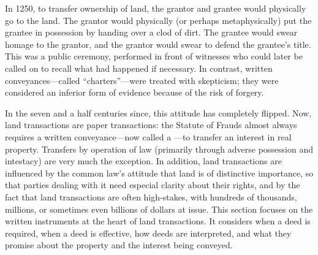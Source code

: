 In 1250, to transfer ownership of land, the grantor and grantee would physically
go to the land. The grantor would physically (or perhaps metaphysically) put
the grantee in possession by handing over a clod of dirt. The grantee would
swear homage to the grantor, and the grantor would swear to defend the
grantee's title. This was a public ceremony, performed in front of witnesses
who could later be called on to recall what had happened if necessary. In
contrast, written conveyances---called ``charters''---were treated with
skepticism; they were considered an inferior form of evidence because of the
risk of forgery.

In the seven and a half centuries since, this attitude has completely flipped.
Now, land transactions are paper transactions: the Statute of Frauds almost
always requires a written conveyance---now called a ---to transfer an
interest in real property. Transfers by operation of law (primarily through
adverse possession and intestacy) are very much the exception. In addition,
land transactions are influenced by the common law's attitude that land is of
distinctive importance, so that parties dealing with it need especial clarity
about their rights, and by the fact that land transactions are often
high-stakes, with hundreds of thousands, millions, or sometimes even billions
of dollars at issue. This section focuses on the written instruments at the
heart of land transactions. It considers when a deed is required, when a deed
is effective, how deeds are interpreted, and what they promise about the
property and the interest being conveyed.


